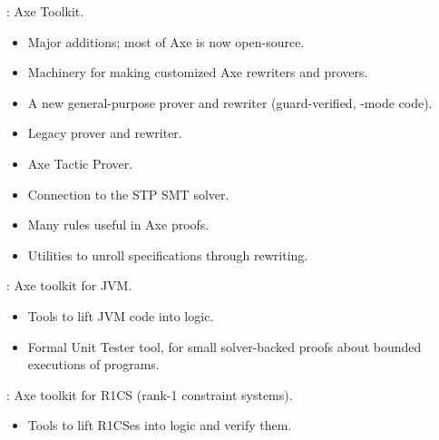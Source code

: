 \begin{frame}

\implibtitle

:
Axe Toolkit.
\begin{itemize}
\item Major additions; most of Axe is now open-source.
\item Machinery for making customized Axe rewriters and provers.
\item A new general-purpose prover and rewriter
      (guard-verified, -mode code).
\item Legacy prover and rewriter.
\item Axe Tactic Prover.
\item Connection to the STP SMT solver.
\item Many rules useful in Axe proofs.
\item Utilities to unroll specifications through rewriting.
\end{itemize}

\end{frame}


\begin{frame}

\implibtitle

:
Axe toolkit for JVM.
\begin{itemize}
\item Tools to lift JVM code into logic.
\item Formal Unit Tester tool, for small solver-backed proofs about
bounded executions of programs.
\end{itemize}

\end{frame}


\begin{frame}

\implibtitle

:
Axe toolkit for R1CS (rank-1 constraint systems).
\begin{itemize}
\item Tools to lift R1CSes into logic and verify them.
\end{itemize}

\end{frame}

